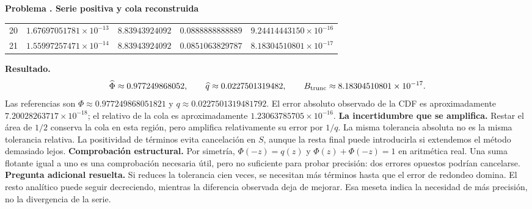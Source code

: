 \documentclass[11pt,a4paper]{article}
\theoremstyle{definition}
\newcounter{problema}
\newenvironment{resuelto}[1]{\refstepcounter{problema}\par\medskip\Needspace{6\baselineskip}\textbf{Problema \theproblema. #1}\par}{\par\medskip}
\begin{document}
\begin{resuelto}{Serie positiva y cola reconstruida}
\begin{center}
\begin{tabular}{rrrrr}
20&$1.67697051781\times10^{-13}$&$8.83943924092$&$0.0888888888889$&$9.24414443150\times10^{-16}$\\
21&$1.55997257471\times10^{-14}$&$8.83943924092$&$0.0851063829787$&$8.18304510801\times10^{-17}$\\
\bottomrule\end{tabular}\end{center}
\textbf{Resultado.}
\[
\widehat\Phi\approx0.977249868052,\qquad \widehat q\approx0.0227501319482,\qquad B_{\rm trunc}\approx8.18304510801\times10^{-17}.
\]
Las referencias son $\Phi\approx0.977249868051821$ y $q\approx0.0227501319481792$. El error absoluto observado de la CDF es aproximadamente $7.20028263717\times10^{-18}$; el relativo de la cola es aproximadamente $1.23063785705\times10^{-16}$.
\textbf{La incertidumbre que se amplifica.} Restar el área de $1/2$ conserva la cola en esta región, pero amplifica relativamente su error por $1/q$. La misma tolerancia absoluta no es la misma tolerancia relativa. La positividad de términos evita cancelación en $S$, aunque la resta final puede introducirla si extendemos el método demasiado lejos.
\textbf{Comprobación estructural.} Por simetría, $\Phi(-z)=q(z)$ y $\Phi(z)+\Phi(-z)=1$ en aritmética real. Una suma flotante igual a uno es una comprobación necesaria útil, pero no suficiente para probar precisión: dos errores opuestos podrían cancelarse.
\textbf{Pregunta adicional resuelta.} Si reduces la tolerancia cien veces, se necesitan más términos hasta que el error de redondeo domina. El resto analítico puede seguir decreciendo, mientras la diferencia observada deja de mejorar. Esa meseta indica la necesidad de más precisión, no la divergencia de la serie.
\end{resuelto}
\end{document}
